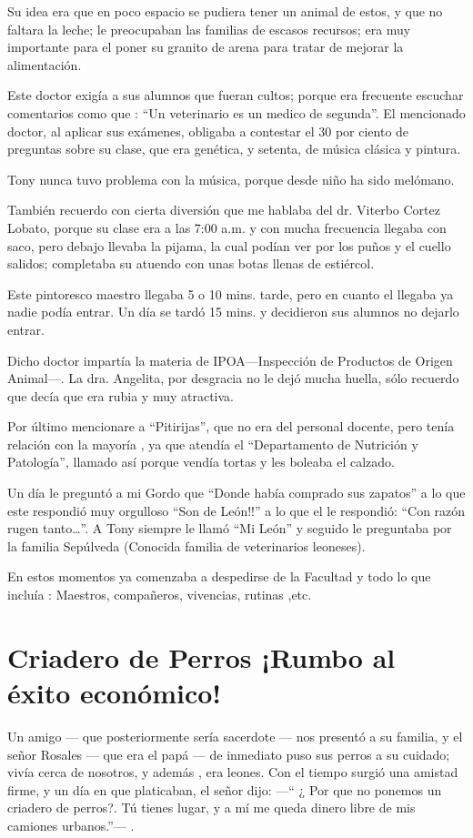 \documentclass[letterpaper, 12pt]{book}
\begin{document}
Su idea era que en poco espacio se pudiera tener un animal de estos, y que no faltara la leche; le preocupaban las familias de escasos recursos; era muy importante para el poner su granito de arena para tratar de mejorar la alimentación.

Este doctor exigía a sus alumnos que fueran cultos; porque era frecuente escuchar comentarios como que : ``Un veterinario es un medico de segunda''.
El mencionado doctor, al aplicar sus exámenes, obligaba a contestar el 30 por ciento de preguntas sobre su clase, que era genética, y setenta, de música clásica y pintura.

Tony nunca tuvo problema con la música, porque desde niño ha sido melómano. 

También recuerdo con cierta diversión que me hablaba del dr. Viterbo Cortez Lobato, porque su clase era a las 7:00 a.m. y con mucha frecuencia llegaba con saco, pero debajo llevaba la pijama, la cual podían  ver por los puños y el cuello salidos; completaba su atuendo con unas botas llenas de estiércol.

Este pintoresco maestro llegaba 5 o 10 mins. tarde, pero en cuanto el llegaba ya nadie podía entrar. Un día se tardó 15 mins. y decidieron sus alumnos no dejarlo entrar. 

Dicho doctor impartía la materia de IPOA---Inspección de Productos de Origen Animal---.
La dra. Angelita, por desgracia no le dejó mucha huella, sólo recuerdo que decía que era rubia y muy atractiva. 

Por último mencionare a ``Pitirijas'', que no era del personal docente, pero tenía relación con la mayoría , ya que atendía el ``Departamento de Nutrición y Patología'', llamado así porque vendía tortas y les boleaba el calzado.

Un día le preguntó a mi Gordo que ``Donde había comprado sus zapatos'' a lo que este respondió muy orgulloso ``Son de León!!'' a lo que el le respondió:
``Con razón rugen tanto\ldots''.  A Tony siempre le llamó ``Mi León'' y seguido le preguntaba por la familia Sepúlveda (Conocida familia de veterinarios leoneses).

En estos momentos ya comenzaba a despedirse de la Facultad y todo lo que incluía : Maestros, compañeros, vivencias, rutinas ,etc.
\chapter{Criadero de Perros ¡Rumbo al éxito económico!}
Un amigo --- que posteriormente sería sacerdote --- nos presentó a su familia, y el señor Rosales --- que era el papá --- de inmediato puso sus perros a su cuidado; vivía cerca de nosotros, y además , era leones. Con el tiempo surgió una amistad firme, y un día en  que platicaban, el señor dijo: ---`` ¿ Por que no ponemos un criadero de perros?. Tú tienes lugar, y a mí me queda dinero libre de mis camiones urbanos.''--- . 
\end{document}

